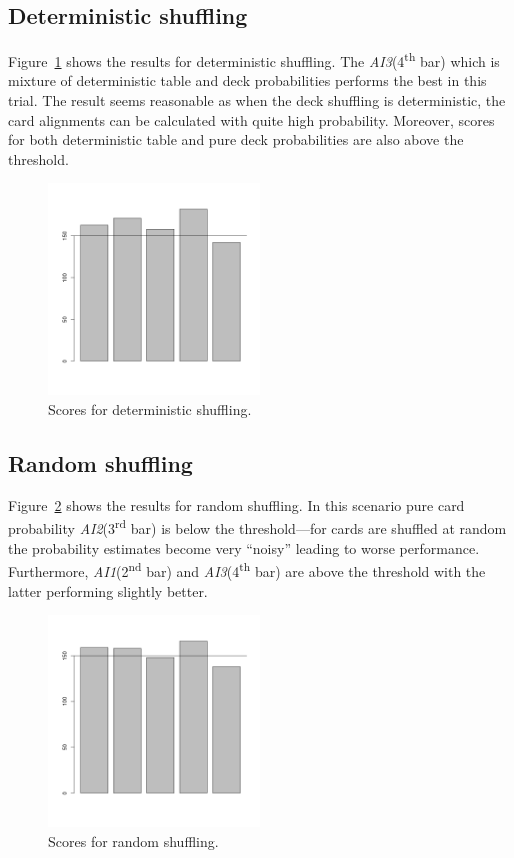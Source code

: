 \documentclass[12pt,a4paper,twocolumn]{article}
\newcommand{\ts}{\textsuperscript}
\begin{document}
\subsection*{Deterministic shuffling}
Figure~\ref{fig:det} shows the results for deterministic shuffling. The \emph{AI3}(4\ts{th} bar) which is mixture of deterministic table and deck probabilities performs the best in this trial. The result seems reasonable as when the deck shuffling is deterministic, the card alignments can be calculated with quite high probability. Moreover, scores for both deterministic table and pure deck probabilities are also above the threshold.\\

\begin{figure}[htbp]
\centering
\includegraphics[width=0.5\textwidth]{deterministic}
\caption{Scores for deterministic shuffling.\label{fig:det}}
\end{figure}

\subsection*{Random shuffling}
Figure~\ref{fig:ran} shows the results for random shuffling. In this scenario pure card probability \emph{AI2}(3\ts{rd} bar)  is below the threshold---for cards are shuffled at random the probability estimates become very ``noisy'' leading to worse performance.\\
Furthermore, \emph{AI1}(2\ts{nd} bar) and \emph{AI3}(4\ts{th} bar) are above the threshold with the latter performing slightly better.

\begin{figure}[htbp]
\centering
\includegraphics[width=0.5\textwidth]{random}
\caption{Scores for random shuffling.\label{fig:ran}}
\end{figure}
\end{document}
